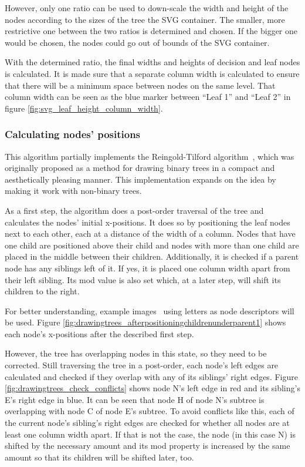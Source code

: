 However, only one ratio can be used to down-scale the width and height of the nodes according to the sizes of the tree the SVG container. The smaller, more restrictive one between the two ratios is determined and chosen. If the bigger one would be chosen, the nodes could go out of bounds of the SVG container.

With the determined ratio, the final widths and heights of decision and leaf nodes is calculated. It is made sure that a separate column width is calculated to ensure that there will be a minimum space between nodes on the same level. That column width can be seen as the blue marker between ``Leaf 1'' and ``Leaf 2'' in figure \ref{fig:svg_leaf_height_column_width}.

\subsubsection{Calculating nodes' positions}
This algorithm partially implements the Reingold-Tilford algorithm~\cite{reingold-tilford-tidier-drawing-of-trees}, which was originally proposed as a method for drawing binary trees in a compact and aesthetically pleasing manner. This implementation expands on the idea by making it work with non-binary trees.

As a first step, the algorithm does a post-order traversal of the tree and calculates the nodes' initial x-positions. It does so by positioning the leaf nodes next to each other, each at a distance of the width of a column. Nodes that have one child are positioned above their child and nodes with more than one child are placed in the middle between their children. Additionally, it is checked if a parent node has any siblings left of it. If yes, it is placed one column width apart from their left sibling. Its mod value is also set which, at a later step, will shift its children to the right.

For better understanding, example images~\cite{reingold_tilford_lim} using letters as node descriptors will be used. Figure \ref{fig:drawingtrees_afterpositioningchildrenunderparent1} shows each node's x-positions after the described first step.

However, the tree has overlapping nodes in this state, so they need to be corrected. Still traversing the tree in a post-order, each node's left edges are calculated and checked if they overlap with any of its siblings' right edges. Figure \ref{fig:drawingtrees_check_conflicts} shows node N's left edge in red and its sibling's E's right edge in blue.
It can be seen that node H of node N's subtree is overlapping with node C of node E's subtree. To avoid conflicts like this, each of the current node's sibling's right edges are checked for whether all nodes are at least one column width apart. If that is not the case, the node (in this case N) is shifted by the necessary amount and its mod property is increased by the same amount so that its children will be shifted later, too.

